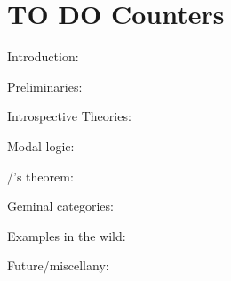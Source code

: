 {\color{red}
\section{TO DO Counters}
Introduction: \theIntroductionCounter

Preliminaries: \thePreliminariesCounter

Introspective Theories: \theIntrospectiveTheoryCounter

Modal logic: \theModalCounter

\Loeb/'s theorem: \theLoebCounter

Geminal categories: \theGLCategoryCounter

Examples in the wild: \theModelsCounter

Future/miscellany: \theFutureCounter
}
